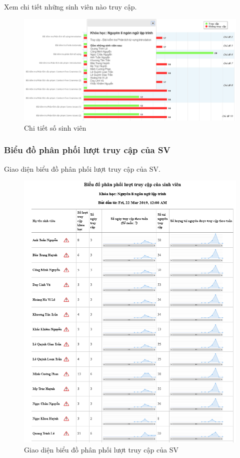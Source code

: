 \vskip 5cm
Xem chi tiết những sinh viên nào truy cập.

\begin{center}
	\begin{figure}[htp]
		\begin{center}
			\includegraphics[width=1\linewidth]{img/28}
		\end{center}
		\caption{Chi tiết số sinh viên}
		\label{refhinh60}
	\end{figure}
\end{center}

\newpage
\subsubsection{Biểu đồ phân phối lượt truy cập của SV}

Giao diện biểu đồ phân phối lượt truy cập của SV.

\begin{center}
	\begin{figure}[htp]
		\begin{center}
			\includegraphics[width=0.9\linewidth]{img/29}
		\end{center}
		\caption{Giao diện biểu đồ phân phối lượt truy cập của SV}
		\label{refhinh61}
	\end{figure}
\end{center}

